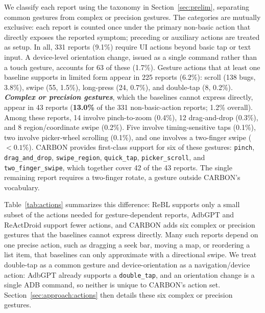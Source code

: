 \documentclass[10pt,conference,a4paper]{IEEEtran}
\begin{document}
  We classify each report using the taxonomy in Section~\ref{sec:prelim},
  separating common gestures from complex or precision gestures. The categories
  are mutually exclusive: each report is counted once under the primary
  non-basic action that directly exposes the reported symptom; preceding or
  auxiliary actions are treated as setup.
  In all, 331 reports (9.1\%) require UI actions beyond basic tap or text
  input. A device-level orientation change, issued as a single command
  rather than a touch gesture, accounts for 63 of these (1.7\%). Gesture
  actions that at least one baseline supports in limited
  form appear in 225 reports (6.2\%): scroll (138 bugs, 3.8\%),
  swipe (55, 1.5\%), long-press (24, 0.7\%), and
  double-tap (8, 0.2\%). \textbf{\emph{Complex or precision gestures}},
  which the baselines cannot express directly, appear in 43 reports
  (\textbf{13.0\%} of the 331 non-basic-action reports; 1.2\% overall). Among these reports, 14 involve
  pinch-to-zoom (0.4\%), 12 drag-and-drop (0.3\%), and 8 region/coordinate
  swipe (0.2\%). Five involve timing-sensitive taps (0.1\%), two involve
  picker-wheel scrolling (0.1\%), and one involves a two-finger swipe
  (${<}0.1\%$). CARBON provides
  first-class support for six of these gestures: \texttt{pinch},
  \texttt{drag\_and\_drop}, \texttt{swipe\_region}, \texttt{quick\_tap},
  \texttt{picker\_scroll}, and \texttt{two\_finger\_swipe}, which
  together cover 42 of the 43 reports. The single remaining report
  requires a two-finger rotate, a gesture outside CARBON's vocabulary.

  Table~\ref{tab:actions} summarizes this difference: ReBL supports only
  a small subset of the actions needed for gesture-dependent reports,
  AdbGPT and ReActDroid support fewer actions, and CARBON adds six complex
  or precision gestures that the baselines cannot express directly. Many such reports depend on one precise action,
  such as dragging a seek bar, moving a map, or reordering a list item,
  that baselines can only approximate with a directional swipe.
  We treat double-tap as a common gesture and device-orientation as a
  navigation/device action: AdbGPT already supports a \texttt{double\_tap},
  and an orientation change is a single ADB command, so neither is unique
  to CARBON's action set. Section~\ref{sec:approach:actions} then details these six complex
  or precision gestures.

\end{document}
